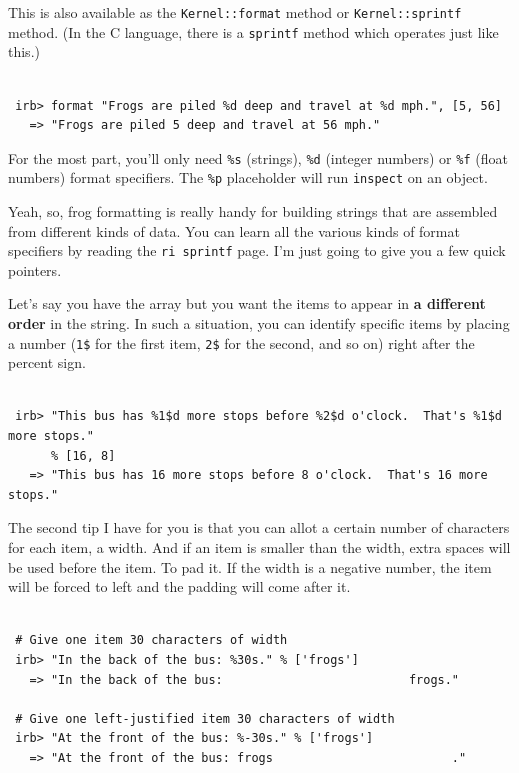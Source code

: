 \documentclass[10pt,twoside]{report}
\begin{document}
This is also available as the
\lstinline[breaklines=true]|Kernel::format| method or
\lstinline[breaklines=true]|Kernel::sprintf| method.  (In the C
language, there is a \lstinline[breaklines=true]|sprintf| method which
operates just like this.)


\begin{lstlisting}

 irb> format "Frogs are piled %d deep and travel at %d mph.", [5, 56]
   => "Frogs are piled 5 deep and travel at 56 mph."

\end{lstlisting}


For the most part, you'll only need \lstinline[breaklines=true]|%s|
(strings), \lstinline[breaklines=true]|%d| (integer numbers) or
\lstinline[breaklines=true]|%f| (float numbers) format specifiers.
The \lstinline[breaklines=true]|%p| placeholder will run
\lstinline[breaklines=true]|inspect| on an object.

Yeah, so, frog formatting is really handy for building strings that
are assembled from different kinds of data.  You can learn all the
various kinds of format specifiers by reading the
\lstinline[breaklines=true]|ri sprintf| page.  I'm just going to give
you a few quick pointers.

Let's say you have the array but you want the items to appear in {\bf
  a different order} in the string.  In such a situation, you can
identify specific items by placing a number
(\lstinline[breaklines=true]|1$| for the first item,
\lstinline[breaklines=true]|2$| for the second, and so on) right after
the percent sign.


\begin{lstlisting}

 irb> "This bus has %1$d more stops before %2$d o'clock.  That's %1$d more stops."
      % [16, 8]
   => "This bus has 16 more stops before 8 o'clock.  That's 16 more stops."

\end{lstlisting}


The second tip I have for you is that you can allot a certain number
of characters for each item, a width.  And if an item is smaller than
the width, extra spaces will be used before the item.  To pad it. If
the width is a negative number, the item will be forced to left and
the padding will come after it.


\begin{lstlisting}

 # Give one item 30 characters of width
 irb> "In the back of the bus: %30s." % ['frogs']
   => "In the back of the bus:                          frogs."

 # Give one left-justified item 30 characters of width
 irb> "At the front of the bus: %-30s." % ['frogs']
   => "At the front of the bus: frogs                         ."

\end{lstlisting}
\end{document}
